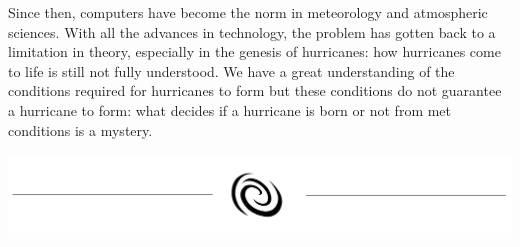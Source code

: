 Since then, computers have become the norm in meteorology and atmospheric sciences. With all the advances in technology, the problem has gotten back to a limitation in theory, especially in the genesis of hurricanes: how hurricanes come to life is still not fully understood. We have a great understanding of the conditions required for hurricanes to form but these conditions do not guarantee a hurricane to form: what decides if a hurricane is born or not from met conditions is a mystery.
\begin{center}
    \includegraphics[width=0.8\linewidth]{assets/hurricane.png}
\end{center}